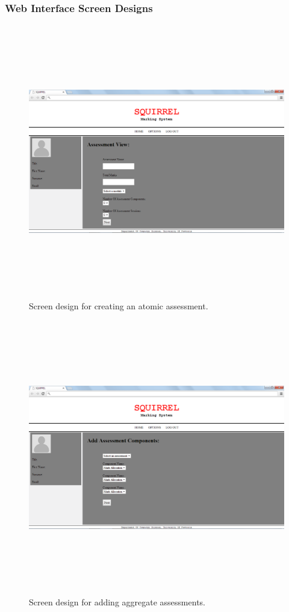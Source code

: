 \documentclass[12pt]{article}
\begin{document}
	\subsubsection{Web Interface Screen Designs}
		\begin{figure}[htbp]
		\centering
		\includegraphics[width=1.0\linewidth,height=12cm]{./Diagrams/web_assessmentView}
		\caption{Screen design for creating an atomic assessment.}
		\label{fig:web_assessmentView}
		\end{figure}
		
		\begin{figure}[htbp]
		\centering
		\includegraphics[width=1.0\linewidth, height=12cm]{./Diagrams/web_assessmentComponent}
		\caption{Screen design for adding aggregate assessments.}
		\label{fig:web_assessmentComponent}
		\end{figure}
	
\end{document}
